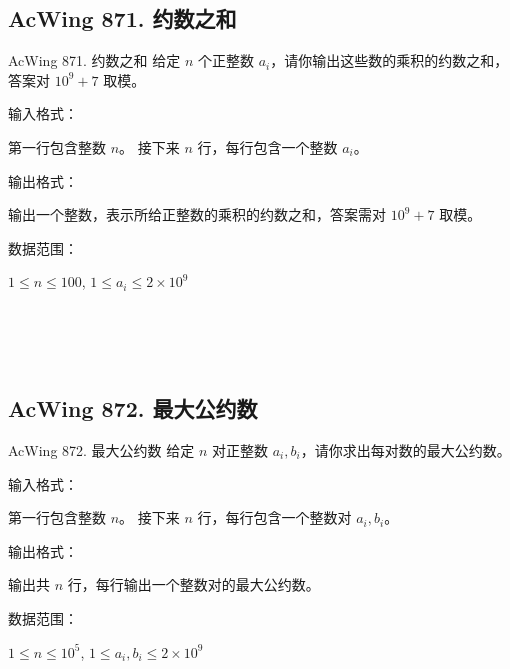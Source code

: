 \subsection{AcWing 871. 约数之和}
\begin{titledbox}{AcWing 871. 约数之和}
给定 $n$ 个正整数 $a_i$，请你输出这些数的乘积的约数之和，答案对 $10^9+7$ 取模。

输入格式：

第一行包含整数 $n$。 接下来 $n$ 行，每行包含一个整数 $a_i$。

输出格式：

输出一个整数，表示所给正整数的乘积的约数之和，答案需对 $10^9+7$ 取模。

数据范围：

$1 \le n \le 100$, $1 \le a_i \le 2 \times 10^9$

\begin{inputblock}
 \\
 \\
 \\
\end{inputblock}
\begin{outputblock}
\end{outputblock}
\end{titledbox}

\subsection{AcWing 872. 最大公约数}
\begin{titledbox}{AcWing 872. 最大公约数}
给定 $n$ 对正整数 $a_i, b_i$，请你求出每对数的最大公约数。

输入格式：

第一行包含整数 $n$。 接下来 $n$ 行，每行包含一个整数对 $a_i,b_i$。

输出格式：

输出共 $n$ 行，每行输出一个整数对的最大公约数。

数据范围：

$1 \le n \le 10^5$, $1 \le a_i, b_i \le 2 \times 10^9$

\begin{inputblock}
 \\
 \\
\end{inputblock}
\begin{outputblock}
 \\
\end{outputblock}
\end{titledbox}


